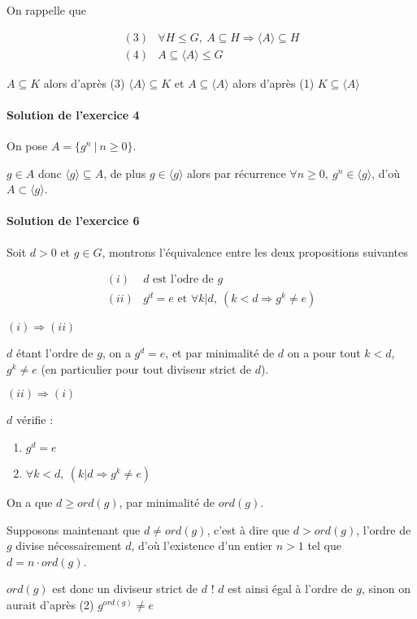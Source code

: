 \documentclass[]{article}
\theoremstyle{remark}
\theoremstyle{definition}
\newenvironment{proofpart}[1]{
	\noindent
	{\boldmath #1}
}{
	\checkmark
}
\begin{document}
On rappelle que 

$$
	\begin{array}{lc}
		(3) & \forall H \leqslant G, ~ A \subseteq H \Longrightarrow \langle A \rangle \subseteq H \\
		(4) & A \subseteq \langle A \rangle \leqslant G
	\end{array}
$$

$A \subseteq K$ alors d'après (3) $\langle A \rangle \subseteq K$ et $A \subseteq \langle A \rangle$ alors d'après (1) $K \subseteq \langle A \rangle$

\paragraph{Solution de l'exercice 4}
On pose $A = \{g^n ~ | ~ n \geqslant 0\}$.

$g \in A$ donc $\langle g \rangle \subseteq A$, de plus $g \in \langle g \rangle$ alors par récurrence $\forall n \geqslant 0, ~ g^n \in \langle g \rangle$, d'où $A \subset \langle g \rangle$.

\paragraph{Solution de l'exercice 6}

Soit $d > 0$ et $g \in G$, montrons l'équivalence entre les deux propositions suivantes

$$
\begin{array}{ll}
	(i) & d \text{ est l'odre de } g \\
	(ii) & g^d=e \text{ et } \forall k | d, ~ (k < d \Longrightarrow g^k \neq e)
\end{array}
$$

\noindent
\begin{proofpart}{$(i) \Longrightarrow (ii)$}

	$d$ étant l'ordre de $g$, on a $g^d=e$, et par minimalité de $d$ on a pour tout $k < d$, $g^k \neq e$ (en particulier pour tout diviseur strict de $d$).
\end{proofpart}

\begin{proofpart}{$(ii) \Longrightarrow (i)$}

	$d$ vérifie :
	\begin{enumerate}
		\item $g^d=e$
		\item $\forall k < d, ~ (k | d \Longrightarrow g^k \neq e)$
	\end{enumerate}
	
	On a que $d \geqslant ord(g)$, par minimalité de $ord(g)$.
	
	Supposons maintenant que $d \neq ord(g)$, c'est à dire que $d > ord(g)$, l'ordre de $g$ divise nécessairement $d$, d'où l'existence d'un entier $n > 1$ tel que $d= n \cdot ord(g)$.
	
	$ord(g)$ est donc un diviseur strict de $d$ ! $d$ est ainsi égal à l'ordre de $g$, sinon on aurait d'après (2) $g^{ord(g)} \neq e$
\end{proofpart}
\end{document}
